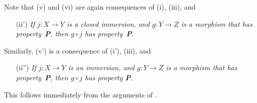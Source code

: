 \begin{env}[5.5.13]
\label{1.5.5.13}
Note that (v) and (vi) are again consequences of (i), (iii), and
\begin{enumerate}
  \item[(ii')] \emph{If $j:X\to Y$ is a closed immersion, and $g:Y\to Z$ is a morphism that has property~\textbf{P}, then $g\circ j$ has property~\textbf{P}}.
\end{enumerate}
Similarly, (v') is a consequence of (i'), (iii), and
\begin{enumerate}
  \item[(ii'')] \emph{If $j:X\to Y$ is an immersion, and $g:Y\to Z$ is a morphism that has property~\textbf{P}, then $g\circ j$ has property \textbf{P}}.
\end{enumerate}
This follows immediately from the arguments of .
\end{env}
